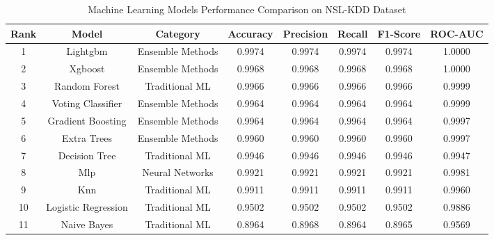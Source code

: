 
\begin{table}[htbp]
\centering
\caption{Machine Learning Models Performance Comparison on NSL-KDD Dataset}
\label{tab:model_performance}
\begin{tabular}{|c|c|c|c|c|c|c|c|}
\hline
\textbf{Rank} & \textbf{Model} & \textbf{Category} & \textbf{Accuracy} & \textbf{Precision} & \textbf{Recall} & \textbf{F1-Score} & \textbf{ROC-AUC} \\
\hline
1 & Lightgbm & Ensemble Methods & 0.9974 & 0.9974 & 0.9974 & 0.9974 & 1.0000 \\
2 & Xgboost & Ensemble Methods & 0.9968 & 0.9968 & 0.9968 & 0.9968 & 1.0000 \\
3 & Random Forest & Traditional ML & 0.9966 & 0.9966 & 0.9966 & 0.9966 & 0.9999 \\
4 & Voting Classifier & Ensemble Methods & 0.9964 & 0.9964 & 0.9964 & 0.9964 & 0.9999 \\
5 & Gradient Boosting & Ensemble Methods & 0.9964 & 0.9964 & 0.9964 & 0.9964 & 0.9997 \\
6 & Extra Trees & Ensemble Methods & 0.9960 & 0.9960 & 0.9960 & 0.9960 & 0.9997 \\
7 & Decision Tree & Traditional ML & 0.9946 & 0.9946 & 0.9946 & 0.9946 & 0.9947 \\
8 & Mlp & Neural Networks & 0.9921 & 0.9921 & 0.9921 & 0.9921 & 0.9981 \\
9 & Knn & Traditional ML & 0.9911 & 0.9911 & 0.9911 & 0.9911 & 0.9960 \\
10 & Logistic Regression & Traditional ML & 0.9502 & 0.9502 & 0.9502 & 0.9502 & 0.9886 \\
11 & Naive Bayes & Traditional ML & 0.8964 & 0.8968 & 0.8964 & 0.8965 & 0.9569 \\
\hline
\end{tabular}
\end{table}
